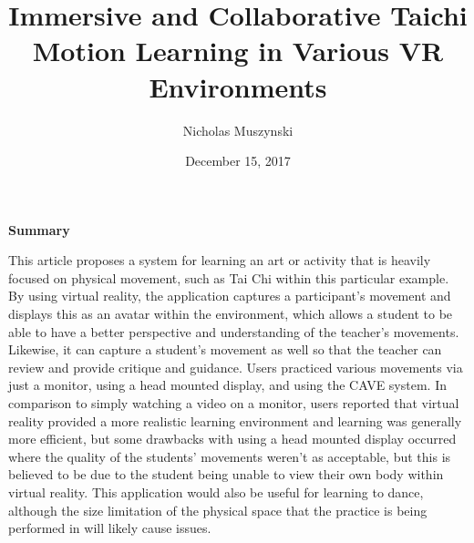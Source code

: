 \documentclass{article}
\begin{document}
\title{Immersive and Collaborative Taichi Motion Learning  in Various VR Environments}
\author{Nicholas Muszynski}
\date{December 15, 2017}

\maketitle

\textbf{Summary}
\newline

This article proposes a system for learning an art or activity that is heavily focused on physical movement, such as Tai Chi within this particular example. By using virtual reality, the application captures a participant's movement and displays this as an avatar within the environment, which allows a student to be able to have a better perspective and understanding of the teacher's movements. Likewise, it can capture a student's movement as well so that the teacher can review and provide critique and guidance. Users practiced various movements via just a monitor, using a head mounted display, and using the CAVE system. In comparison to simply watching a video on a monitor, users reported that virtual reality provided a more realistic learning environment and learning was generally more efficient, but some drawbacks with using a head mounted display occurred where the quality of the students' movements weren't as acceptable, but this is believed to be due to the student being unable to view their own body within virtual reality. This application would also be useful for learning to dance, although the size limitation of the physical space that the practice is being performed in will likely cause issues.

\nocite{taichiCite}



\end{document}
